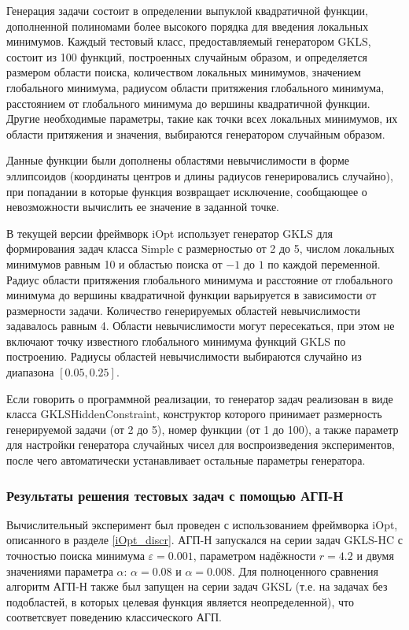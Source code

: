 \documentclass[a4paper,12pt,russian]{article}
\begin{document}
Генерация задачи состоит в определении выпуклой квадратичной функции, дополненной полиномами более высокого порядка для введения локальных минимумов. Каждый тестовый класс, предоставляемый генератором GKLS, состоит из 100 функций, построенных случайным образом, и определяется размером области поиска, количеством локальных минимумов, значением глобального минимума, радиусом области притяжения глобального минимума, расстоянием от глобального минимума до вершины квадратичной функции. Другие необходимые параметры, такие как точки всех локальных минимумов, их области притяжения и значения, выбираются генератором случайным образом.

Данные функции были дополнены областями невычислимости в форме эллипсоидов (координаты центров и длины радиусов генерировались случайно), при попадании в которые функция возвращает исключение, сообщающее о невозможности вычислить ее значение в заданной точке.

В текущей версии фреймворк iOpt использует генератор GKLS для формирования задач класса Simple с размерностью от 2 до 5, числом локальных минимумов равным 10 и областью поиска от $-1$ до $1$ по каждой переменной. Радиус области притяжения глобального минимума и расстояние от глобального минимума до вершины квадратичной функции варьируется в зависимости от размерности задачи. Количество генерируемых областей невычислимости задавалось равным 4. Области невычислимости могут пересекаться, при этом не включают точку известного глобального минимума функций GKLS по построению. Радиусы областей невычислимости выбираются случайно из диапазона $[0.05, 0.25]$.

Если говорить о программной реализации, то генератор задач реализован в виде класса GKLSHiddenConstraint, конструктор которого принимает размерность генерируемой задачи (от 2 до 5), номер функции (от 1 до 100), а также параметр для настройки генератора случайных чисел для воспроизведения экспериментов, после чего автоматически устанавливает остальные параметры генератора.

\subsubsection{Результаты решения тестовых задач с помощью АГП-Н}

Вычислительный эксперимент был проведен с использованием фреймворка iOpt, описанного в разделе \ref{iOpt_discr}. АГП-Н запускался на серии задач GKLS-HC с точностью поиска минимума $\varepsilon = 0.001$, параметром надёжности $r = 4.2$ и двумя значениями параметра $\alpha$: $\alpha = 0.08$ и $\alpha = 0.008$. Для полноценного сравнения алгоритм АГП-Н также был запущен на серии задач GKSL (т.е. на задачах без подобластей, в которых целевая функция является неопределенной), что соответсвует поведению классического АГП.
\end{document}
